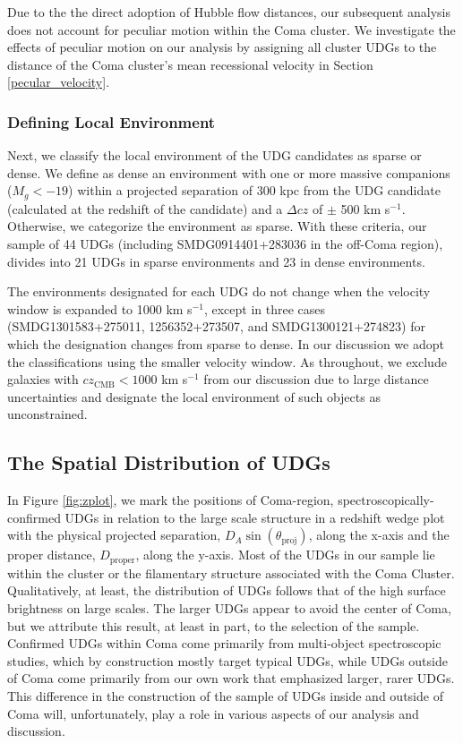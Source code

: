 \documentclass[twocolumn,tighten]{aastex63}
\begin{document}
Due to the the direct adoption of Hubble flow distances, our subsequent analysis does not account for peculiar motion within the Coma cluster. We investigate the effects of peculiar motion on our analysis by assigning all cluster UDGs to the distance of the Coma cluster's mean recessional velocity in Section \ref{pecular_velocity}.

\medskip

\subsubsection{Defining Local Environment}

Next, we classify the local environment of the UDG candidates as sparse or dense.  We define as dense an environment with one or more massive companions ($M_g<-19$) within a projected separation of 300 kpc from the UDG candidate (calculated at the redshift of the candidate) and a $\Delta cz$ of $\pm$ 500 km s$^{-1}$. Otherwise, we categorize the environment as sparse. With these criteria, our sample of 44 UDGs (including SMDG0914401+283036 in the off-Coma region), divides into 21 UDGs in sparse environments and 23 in dense environments.

The environments designated for each UDG do not change when the velocity window is expanded to 1000 km s$^{-1}$, except in three cases (SMDG1301583+275011, 1256352+273507, and SMDG1300121+274823) for which the designation changes from sparse to dense. In our discussion we adopt the classifications using the smaller velocity window. As throughout, we exclude galaxies with $cz_\text{CMB}<1000$ km s$^{-1}$ from our discussion due to large distance uncertainties and designate the local environment of such objects as unconstrained.

\subsection{The Spatial Distribution of UDGs}

In Figure \ref{fig:zplot}, we mark the positions of Coma-region, spectroscopically-confirmed UDGs in relation to the large scale structure in a redshift wedge plot with the physical projected separation, $D_A \sin(\theta_\text{proj})$, along the x-axis and the proper distance, $D_\mathrm{proper}$, along the y-axis. Most of the UDGs in our sample lie within the cluster or the filamentary structure associated with the Coma Cluster. Qualitatively, at least, the distribution of UDGs follows that of the high surface brightness on large scales. The larger UDGs appear to avoid the center of Coma, but we attribute this result, at least in part, to the selection of the sample. Confirmed UDGs within Coma come primarily from multi-object spectroscopic studies, which by construction mostly target typical UDGs, while UDGs outside of Coma come primarily from our own work that emphasized larger, rarer UDGs. This difference in the construction of the sample of UDGs inside and outside of Coma will, unfortunately, play a role in various aspects of our analysis and discussion.
\end{document}
